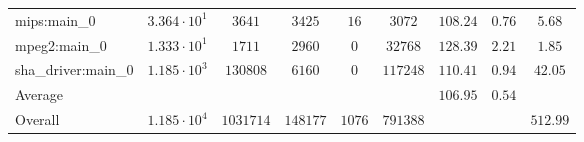 \begin{tabular}{|l|c|c|c|c|c|c|c|c|}
mips:main\_0            & $ 3.364 \cdot 10^{1} $ & $ 3641    $ & $ 3425   $ & $ 16   $ & $ 3072   $ & $ 108.24      $ & $ 0.76    $ & $ 5.68    $ \\
mpeg2:main\_0           & $ 1.333 \cdot 10^{1} $ & $ 1711    $ & $ 2960   $ & $ 0    $ & $ 32768  $ & $ 128.39      $ & $ 2.21    $ & $ 1.85    $ \\
sha\_driver:main\_0     & $ 1.185 \cdot 10^{3} $ & $ 130808  $ & $ 6160   $ & $ 0    $ & $ 117248 $ & $ 110.41      $ & $ 0.94    $ & $ 42.05   $ \\
\hline
Average                 & $                    $ & $         $ & $        $ & $      $ & $        $ & $ 106.95      $ & $ 0.54    $ & $         $ \\
\hline
Overall                 & $ 1.185 \cdot 10^{4} $ & $ 1031714 $ & $ 148177 $ & $ 1076 $ & $ 791388 $ & $             $ & $         $ & $ 512.99  $ \\
\hline
\end{tabular}
